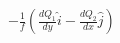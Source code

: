 \documentclass{article}
\begin{document}
$-\frac{1}{f}(\frac{dQ_{1}}{dy}\hat{i}-\frac{dQ_{2}}{dx}\hat{j})$
\end{document}

